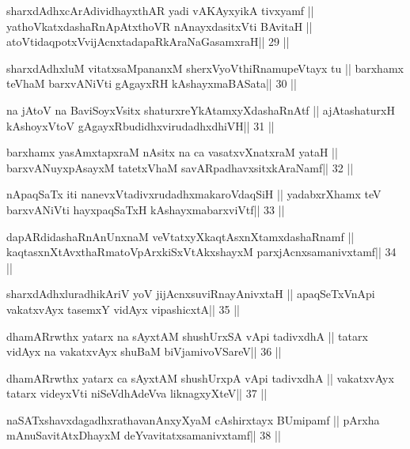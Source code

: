 \begin{shl}
sharxdAdhxcArAdividhayxthAR yadi vA\s\s KAyxyikA tivxyamf ||
yathoVkatxdashaRnApAtxthoVR nAnayxdasitxVti BAvitaH ||
atoV\s tidaqpotxV\s vijAcnxtadapaRkAraNaGasamxraH\hfill || 29 ||
\end{shl}

\begin{shl}
sharxdAdhxluM vitatxsaMpananxM sherxVyoVthiRnamupeVtayx tu ||
barxhamx teV\s haM barxvANiVti gAgayxRH kAshayxmaBASata\hfill || 30 ||
\end{shl}

\begin{shl}
na jAtoV na BaviSoyxV\s sitx shaturxreYkAtamxyXdashaRnAtf ||
ajAtashaturxH kAshoyxV\s toV gAgayxRbudidhxvirudadhxdhiVH\hfill || 31 ||
\end{shl}

\begin{shl}
barxhamx yasAmxtapxraM nAsitx na ca vasatxvXnatxraM yataH ||
barxvANuyxpAsayxM tatetxV\s haM savARpadhavxsitxkAraNamf\hfill || 32 ||
\end{shl}

\begin{shl}
nApaqSaTx iti nanevxVtadivxrudadhxmakaroVdaqSiH ||
yadabxrXhamx teV barxvANiVti hayxpaqSaTxH kAshayxmabarxviVtf\hfill || 33 ||
\end{shl}

\begin{shl}
dapARdidashaRnAnUnxnaM veVtatxyXkaqtAsxnXtamxdashaRnamf ||
kaqtasxnXtAvxthaRmatoV\s pArxkiSxVtAkxshayxM parxjAcnxsamanivxtamf\hfill || 34 ||
\end{shl}

\begin{shl}
sharxdAdhxluradhikAriV yoV jijAcnxsuviRnayAnivxtaH ||
apaqSeTxVnApi vakatxvAyx tasemxY vidAyx vipashicxtA\hfill || 35 ||
\end{shl}

\begin{shl}
dhamARrwthx yatarx na sAyxtAM shushUrxSA vA\s pi tadivxdhA ||
tatarx vidAyx na vakatxvAyx shuBaM biVjamivoVSareV\hfill || 36 ||
\end{shl}

\begin{shl}
dhamARrwthx yatarx ca sAyxtAM shushUrxpA vA\s pi tadivxdhA ||
vakatxvAyx tatarx videyxVti niSeVdhAdeVva liknagxyXteV\hfill || 37 ||
\end{shl}

\begin{shl}
naSATxshavxdagadhxrathavanAnxyXyaM cA\s\s shirxtayx BUmipamf ||
pArxha mAnuSavitAtxDhayxM deYvavitatxsamanivxtamf\hfill || 38 ||
\end{shl}

